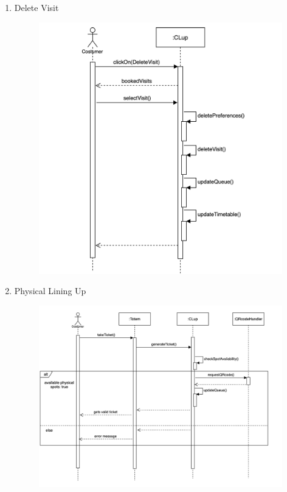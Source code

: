 \documentclass[]{article}
\begin{document}
\begin{enumerate}
						\item Delete Visit
						\bigskip\bigskip\bigskip
							\begin{figure}[H]
								\centering
								\includegraphics[scale=0.9]{DeleteVisit.png}
								\caption{}
								\label{fig:deletevisit_sequencediagram}
							\end{figure}
							
						\newpage	
						\item Physical Lining Up
						\bigskip\bigskip\bigskip
							\begin{figure}[H]
								\centering
								\includegraphics[width=\linewidth]{PhysicalTicket.png}
								\caption{}
								\label{fig:physicalticket_sequencediagram}
							\end{figure}
						

\end{enumerate}
\end{document}
